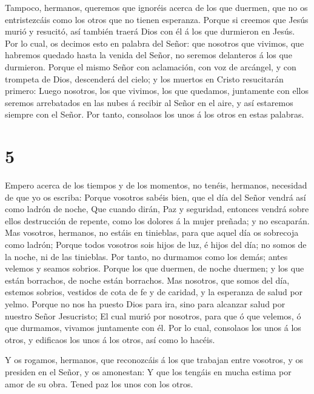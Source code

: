  Tampoco, hermanos, queremos que ignoréis acerca de los que
duermen, que no os entristezcáis como los otros que no tienen esperanza.
 Porque si creemos que Jesús murió y resucitó, así también
traerá Dios con él á los que durmieron en Jesús.  Por lo
cual, os decimos esto en palabra del Señor: que nosotros que vivimos,
que habremos quedado hasta la venida del Señor, no seremos delanteros á
los que durmieron.  Porque el mismo Señor con aclamación,
con voz de arcángel, y con trompeta de Dios, descenderá del cielo; y los
muertos en Cristo resucitarán primero:  Luego nosotros, los
que vivimos, los que quedamos, juntamente con ellos seremos arrebatados
en las nubes á recibir al Señor en el aire, y así estaremos siempre con
el Señor.  Por tanto, consolaos los unos á los otros en
estas palabras.

\hypertarget{section-4}{%
\section{5}\label{section-4}}

 Empero acerca de los tiempos y de los momentos, no tenéis,
hermanos, necesidad de que yo os escriba:  Porque vosotros
sabéis bien, que el día del Señor vendrá así como ladrón de noche,
 Que cuando dirán, Paz y seguridad, entonces vendrá sobre
ellos destrucción de repente, como los dolores á la mujer preñada; y no
escaparán.  Mas vosotros, hermanos, no estáis en tinieblas,
para que aquel día os sobrecoja como ladrón;  Porque todos
vosotros sois hijos de luz, é hijos del día; no somos de la noche, ni de
las tinieblas.  Por tanto, no durmamos como los demás; antes
velemos y seamos sobrios.  Porque los que duermen, de noche
duermen; y los que están borrachos, de noche están borrachos.
 Mas nosotros, que somos del día, estemos sobrios, vestidos
de cota de fe y de caridad, y la esperanza de salud por yelmo.
 Porque no nos ha puesto Dios para ira, sino para alcanzar
salud por nuestro Señor Jesucristo;  El cual murió por
nosotros, para que ó que velemos, ó que durmamos, vivamos juntamente con
él.  Por lo cual, consolaos los unos á los otros, y
edificaos los unos á los otros, así como lo hacéis.

 Y os rogamos, hermanos, que reconozcáis á los que trabajan
entre vosotros, y os presiden en el Señor, y os amonestan: 
Y que los tengáis en mucha estima por amor de su obra. Tened paz los
unos con los otros.


